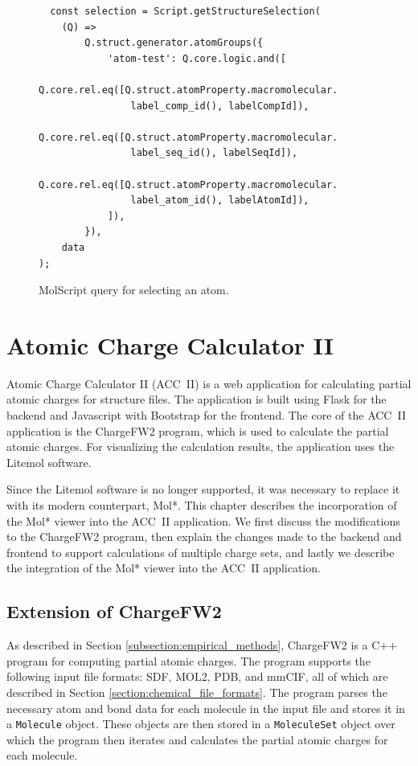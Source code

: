 \documentclass[
  digital,     %
  oneside,     %
  nosansbold,  %
  nocolorbold, %
  lof,         %
  lot,         %
]{fithesis4}
\begin{document}
\begin{figure}[htbp]
  \begin{verbatim}
  const selection = Script.getStructureSelection(
    (Q) =>
        Q.struct.generator.atomGroups({
            'atom-test': Q.core.logic.and([
                Q.core.rel.eq([Q.struct.atomProperty.macromolecular.
                label_comp_id(), labelCompId]),
                Q.core.rel.eq([Q.struct.atomProperty.macromolecular.
                label_seq_id(), labelSeqId]),
                Q.core.rel.eq([Q.struct.atomProperty.macromolecular.
                label_atom_id(), labelAtomId]),
            ]),
        }),
    data
);
\end{verbatim}
\caption{MolScript query for selecting an atom.}
\label{fig:focus}
\end{figure}

\newpage
\chapter{Atomic Charge Calculator II}
\label{chapter:atomic_charge_calculator_ii}

Atomic Charge Calculator II (ACC~II) is a web application for calculating partial atomic charges for structure files. The application is built using Flask for the backend and Javascript with Bootstrap for the frontend. The core of the ACC~II application is the ChargeFW2 program, which is used to calculate the partial atomic charges. For visualizing the calculation results, the application uses the Litemol software. \cite{racek2020acc2} 

Since the Litemol software is no longer supported, it was necessary to replace it with its modern counterpart, Mol*. This chapter describes the incorporation of the Mol* viewer into the ACC~II application. We first discuss the modifications to the ChargeFW2 program, then explain the changes made to the backend and frontend to support calculations of multiple charge sets, and lastly we describe the integration of the Mol* viewer into the ACC~II application.

\section{Extension of ChargeFW2}
\label{section:chargefw2_extension}

As described in Section \ref{subsection:empirical_methods}, ChargeFW2 is a C++ program for computing partial atomic charges. The program supports the following input file formats: SDF, MOL2, PDB, and mmCIF, all of which are described in Section \ref{section:chemical_file_formats}. The program parses the necessary atom and bond data for each molecule in the input file and stores it in a \texttt{Molecule} object. These objects are then stored in a \texttt{MoleculeSet} object over which the program then iterates and calculates the partial atomic charges for each molecule.
\end{document}
